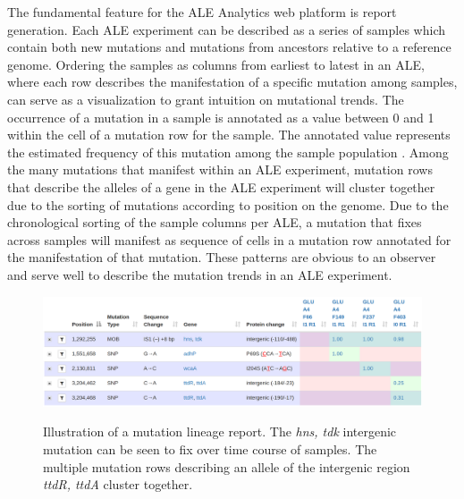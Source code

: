 \documentclass[12pt,final,masters,chapterheads]{ucsd}  %
\begin{document}
The fundamental feature for the ALE Analytics web platform is report generation. Each ALE experiment can be described as a series of samples which contain both new mutations and mutations from ancestors relative to a reference genome. Ordering the samples as columns from earliest to latest in an ALE, where each row describes the manifestation of a specific mutation among samples, can serve as a visualization to grant intuition on mutational trends. The occurrence of a mutation in a sample is annotated as a value between 0 and 1 within the cell of a mutation row for the sample. The annotated value represents the estimated frequency of this mutation among the sample population \cite{breseq_paper}. Among the many mutations that manifest within an ALE experiment, mutation rows that describe the alleles of a gene in the ALE experiment will cluster together due to the sorting of mutations according to position on the genome. Due to the chronological sorting of the sample columns per ALE, a mutation that fixes across samples will manifest as sequence of cells in a mutation row annotated for the manifestation of that mutation. These patterns are obvious to an observer and serve well to describe the mutation trends in an ALE experiment.

\begin{figure}[H]
  \caption{Illustration of a mutation lineage report. The \textit{hns, tdk} intergenic mutation can be seen to fix over time course of samples. The multiple mutation rows describing an allele of the intergenic region \textit{ttdR, ttdA} cluster together.}
  \centering
  \includegraphics[width=1\textwidth]{mutation_lineage_report.png}
  \label{fig:mutation_lineage_report}
\end{figure}
\end{document}
